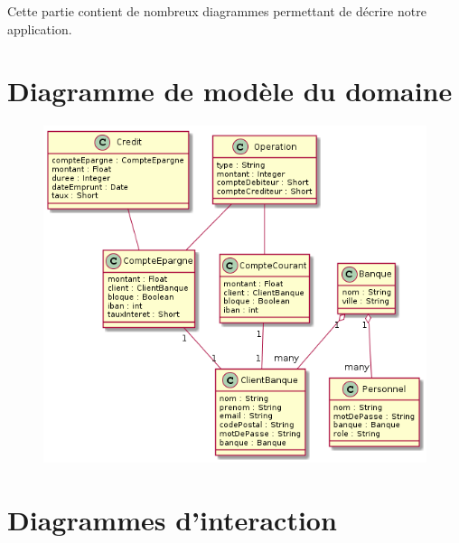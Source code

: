Cette partie contient de nombreux diagrammes permettant de décrire notre application.
\section{Diagramme de modèle du domaine}
\begin{figure}[h!]
\begin{center}
   \caption{\color{orange}{Diagramme de modèle du domaine}}
   \includegraphics[scale=0.5]{images/modeleDuDomaine.png}
   \end{center}
\end{figure}
\newpage
\section{Diagrammes d'interaction}
